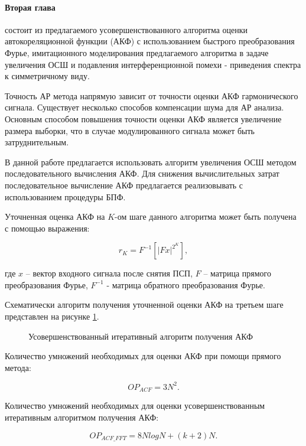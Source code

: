 \paragraph{Вторая глава} состоит из предлагаемого усовершенствованного алгоритма оценки автокореляционной функции (АКФ) с использованием
быстрого преобразования Фурье, имитационного моделирования предлагаемого алгоритма в задаче увеличения ОСШ и подавления 
интерференционной помехи - приведения спектра к симметричному виду.

Точность АР метода напрямую зависит от точности оценки АКФ гармонического сигнала.
Существует несколько способов компенсации шума для АР анализа.
Основным способом повышения точности оценки АКФ является увеличение размера выборки, что в случае модулированного сигнала может быть затруднительным. 

В данной работе предлагается использовать алгоритм увеличения ОСШ методом последовательного вычисления АКФ.
Для снижения вычислительных затрат последовательное вычисление АКФ предлагается реализовывать с использованием процедуры БПФ. 

Уточненная оценка АКФ на ${K}$-ом шаге данного алгоритма может быть получена с помощью выражения:
\begin{center}
\begin{equation}
	\label{eq:akf_3}
	\hat{r}_K = F^{-1}\left[ \left| Fx \right| ^{2^K} \right],
\end{equation}
\end{center}
где ${x}$ – вектор входного сигнала после снятия ПСП, ${F}$ – матрица прямого преобразования Фурье,
${F^{-1}}$ - матрица обратного преобразования Фурье.

Схематически алгоритм получения уточненной оценки АКФ на третьем шаге представлен на рисунке \ref{pic:akf_pic}.
\begin{figure}[H]
	\center{}
	\caption{Усовершенствованный итеративный алгоритм получения АКФ}
	\label{pic:akf_pic}
\end{figure}

Количество умножений необходимых для оценки АКФ при помощи прямого метода:
\begin{center}
\begin{equation}
	OP_{ACF} = 3N^2.
\end{equation}
\end{center}

Количество умножений необходимых для оценки усовершенствованным итеративным алгоритмом получения АКФ: \begin{center}
\begin{equation}
	OP_{ACF\_FFT} = 8NlogN + (k+2)N.
\end{equation}
\end{center}


